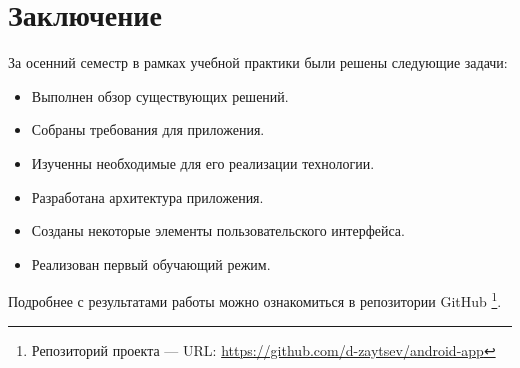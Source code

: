 \chapter{Заключение}
За осенний семестр в рамках учебной практики были решены следующие задачи:\par
\begin{itemize}
  \item Выполнен обзор существующих решений.
  \item Собраны требования для приложения.
  \item Изученны необходимые для его реализации технологии.
  \item Разработана архитектура приложения.
  \item Созданы некоторые элементы пользовательского интерфейса.
  \item Реализован первый обучающий режим.
\end{itemize}
Подробнее с результатами работы можно ознакомиться в репозитории GitHub \footnote{Репозиторий проекта --- URL: \url{https://github.com/d-zaytsev/android-app}}.